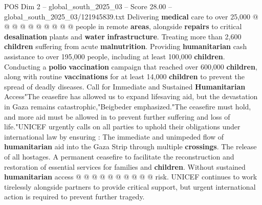 \begin{textsample}{POS Dim 2 – global\_south\_2025\_03 – Score 28.00 – global\_south\_2025\_03/121945839.txt}
Delivering \textbf{medical} care to over 25,000 @ @ @ @ @ @ @ @ @ @ people in remote \textbf{areas}, alongside \textbf{repairs} to critical \textbf{desalination} plants and \textbf{water} \textbf{infrastructure}.
Treating more than 2,600 \textbf{children} suffering from acute \textbf{malnutrition}.
Providing \textbf{humanitarian} cash assistance to over 195,000 people, including at least 100,000 \textbf{children}.
Conducting a \textbf{polio} \textbf{vaccination} campaign that reached over 600,000 \textbf{children}, along with routine \textbf{vaccinations} for at least 14,000 \textbf{children} to prevent the spread of deadly diseases.
Call for Immediate and Sustained \textbf{Humanitarian} Access"The ceasefire has allowed us to expand lifesaving aid, but the devastation in Gaza remains catastrophic,"Beigbeder emphasized."The ceasefire must hold, and more aid must be allowed in to prevent further suffering and loss of life."UNICEF urgently calls on all parties to uphold their obligations under international law by ensuring : The immediate and unimpeded flow of \textbf{humanitarian} aid into the Gaza Strip through multiple \textbf{crossings}.
The release of all hostages.
A permanent ceasefire to facilitate the reconstruction and restoration of essential services for families and \textbf{children}.
Without sustained \textbf{humanitarian} access @ @ @ @ @ @ @ @ @ @ risk.
UNICEF continues to work tirelessly alongside partners to provide critical support, but urgent international action is required to prevent further tragedy.

\end{textsample}

